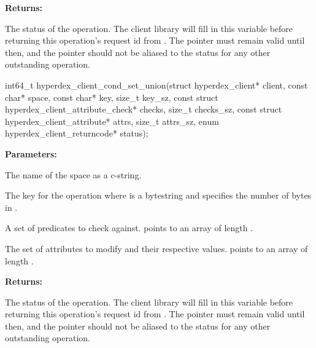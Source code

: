 \noindent\textbf{Returns:}
\begin{description}[labelindent=\widthof{{\code{status}}},leftmargin=*,noitemsep,nolistsep,align=right]
\item[\code{status}] The status of the operation.  The client library will fill in this variable before returning this operation's request id from .  The pointer must remain valid until then, and the pointer should not be aliased to the status for any other outstanding operation.
\end{description}

\funcsep
{}
\begin{ccode}
int64_t hyperdex_client_cond_set_union(struct hyperdex_client* client,
                const char* space,
                const char* key, size_t key_sz,
                const struct hyperdex_client_attribute_check* checks, size_t checks_sz,
                const struct hyperdex_client_attribute* attrs, size_t attrs_sz,
                enum hyperdex_client_returncode* status);
\end{ccode}
\funcdesc 

\noindent\textbf{Parameters:}
\begin{description}[labelindent=\widthof{{\code{checks}, \code{checks\_sz}}},leftmargin=*,noitemsep,nolistsep,align=right]
\item[\code{space}] The name of the space as a c-string.
\item[\code{key}, \code{key\_sz}] The key for the operation where  is a bytestring and  specifies the number of bytes in .
\item[\code{checks}, \code{checks\_sz}] A set of predicates to check against.   points to an array of length .
\item[\code{attrs}, \code{attrs\_sz}] The set of attributes to modify and their respective values.   points to an array of length .
\end{description}

\noindent\textbf{Returns:}
\begin{description}[labelindent=\widthof{{\code{status}}},leftmargin=*,noitemsep,nolistsep,align=right]
\item[\code{status}] The status of the operation.  The client library will fill in this variable before returning this operation's request id from .  The pointer must remain valid until then, and the pointer should not be aliased to the status for any other outstanding operation.
\end{description}

